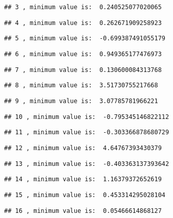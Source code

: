 \documentclass[
]{article}
\begin{document}
\begin{verbatim}
## 3 , minimum value is:  0.240525077020065
\end{verbatim}

\begin{verbatim}
## 4 , minimum value is:  0.262671909258923
\end{verbatim}

\begin{verbatim}
## 5 , minimum value is:  -0.699387491055179
\end{verbatim}

\begin{verbatim}
## 6 , minimum value is:  0.949365177476973
\end{verbatim}

\begin{verbatim}
## 7 , minimum value is:  0.130600084313768
\end{verbatim}

\begin{verbatim}
## 8 , minimum value is:  3.51730755217668
\end{verbatim}

\begin{verbatim}
## 9 , minimum value is:  3.07785781966221
\end{verbatim}

\begin{verbatim}
## 10 , minimum value is:  -0.795345146822112
\end{verbatim}

\begin{verbatim}
## 11 , minimum value is:  -0.303366878680729
\end{verbatim}

\begin{verbatim}
## 12 , minimum value is:  4.64767393430379
\end{verbatim}

\begin{verbatim}
## 13 , minimum value is:  -0.403363137393642
\end{verbatim}

\begin{verbatim}
## 14 , minimum value is:  1.16379372652619
\end{verbatim}

\begin{verbatim}
## 15 , minimum value is:  0.453314295028104
\end{verbatim}

\begin{verbatim}
## 16 , minimum value is:  0.05466614868127
\end{verbatim}
\end{document}
